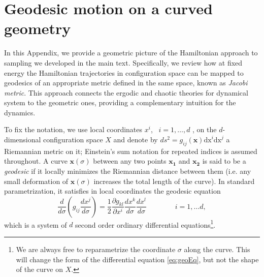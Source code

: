 \documentclass[twoside,11pt]{article}
\begin{document}



\appendix


\section{Geodesic motion on a curved geometry} \label{sec: geodesic}
In this Appendix, we provide a geometric picture of the Hamiltonian approach
to sampling we developed in the main text. Specifically, we review how at
fixed energy the Hamiltonian trajectories in configuration space can be mapped
to geodesics of an appropriate metric defined in the same space, known as
\textit{Jacobi metric}. This approach connects the ergodic and chaotic
theories for dynamical system to the geometric ones, providing a
complementary intuition for the dynamics. 


To fix the notation, we use local coordinates $x^i$, \ $i = 1, \ldots, d$ ,
on the $d$-dimensional configuration space $X$ and denote by $d  s^2 =
g_{i j} (\mathbf{x}) \text{dx}^i \text{dx}^j$ a Riemannian metric on it;
Einstein's sum notation for repeated indices is assumed throughout. A curve
$\mathbf{x} (\sigma)$ between any two points $\mathbf{x_1}$ and
$\mathbf{x_2}$ is said to be a \emph{geodesic} if it locally minimizes the
Riemannian distance between them (i.e. any small deformation of $\mathbf{x}(\sigma)$ increases the
total length of the curve). In standard parametrization, it satisfies in local
coordinates the geodesic equation
\begin{equation}
  \frac{d}{d \sigma} \left( g_{i j}  \frac{d x^j}{d \sigma} \right) =
  \frac{1}{2} \frac{\partial g_{k l}}{\partial x^i} \frac{d x^k}{d \sigma}
  \frac{d x^l}{d \sigma} \hspace{4em} i = 1, \ldots d, \label{eq:geoEq}
\end{equation}
which is a system of $d$ second order ordinary differential equations\footnote{
We are always free to reparametrize the coordinate $\sigma$ along the curve.
This will change the form of the differential equation \eqref{eq:geoEq}, but
not the shape of the curve on $X$.%
}.
\end{document}
